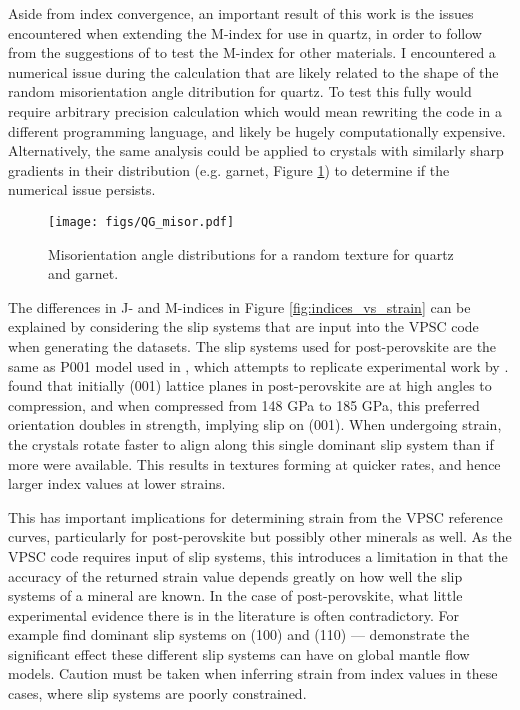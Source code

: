 \documentclass[a4paper,12pt,twoside]{report}
\numberwithin{equation}{chapter}
\begin{document}
Aside from index convergence, an important result of this work is the issues encountered when extending the M-index for use in quartz, in order to follow from the suggestions of \cite{Skemer} to test the M-index for other materials. I encountered a numerical issue during the calculation that are likely related to the shape of the random misorientation angle ditribution for quartz. To test this fully would require arbitrary precision calculation which would mean rewriting the code in a different programming language, and likely be hugely computationally expensive. Alternatively, the same analysis could be applied to crystals with similarly sharp gradients in their distribution (e.g. garnet, Figure \ref{fig:garnet}) to determine if the numerical issue persists.

\begin{figure}[h!]
  \centering
    \texttt{[image: figs/QG\_misor.pdf]}
  \caption[Garnet misorientation angle distribution]{Misorientation angle distributions for a random texture for quartz and garnet.} 
  \label{fig:garnet}
\end{figure} 

The differences in J- and M-indices in Figure \ref{fig:indices_vs_strain} can be explained by considering the slip systems that are input into the VPSC code when generating the datasets. The slip systems used for post-perovskite are the same as P001 model used in \cite{Walker2012}, which attempts to replicate experimental work by \citep{Miyagi2010}. \cite{Miyagi2010} found that initially (001) lattice planes in post-perovskite are at high angles to compression, and when compressed from 148 GPa to 185 GPa, this preferred orientation doubles in strength, implying slip on (001). When undergoing strain, the crystals rotate faster to align along this single dominant slip system than if more were available. This results in textures forming at quicker rates, and hence larger index values at lower strains.

This has important implications for determining strain from the VPSC reference curves, particularly for post-perovskite but possibly other minerals as well. As the VPSC code requires input of slip systems, this introduces a limitation in that the accuracy of the returned strain value depends greatly on how well the slip systems of a mineral are known. In the case of post-perovskite, what little experimental evidence there is in the literature is often contradictory. For example \cite{Merkel2007} find dominant slip systems on (100) and (110) --- \cite{Walker2012} demonstrate the significant effect these different slip systems can have on global mantle flow models. Caution must be taken when inferring strain from index values in these cases, where slip systems are poorly constrained.
\end{document}
